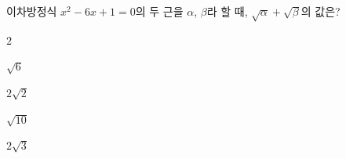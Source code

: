 이차방정식 $x^2-6x+1=0$의 두 근을 $\alpha$, $\beta$라 할 때, $\sqrt{\alpha}+\sqrt{\beta}$의 값은?
\begin{choices32}{\rule[-3ex]{0pt}{8ex}$2$}{\rule[-3ex]{0pt}{8ex}$\sqrt{6}$}{\rule[-3ex]{0pt}{8ex}$2\sqrt{2}$}{\rule[-3ex]{0pt}{8ex}$\sqrt{10}$}{\rule[-3ex]{0pt}{8ex}$2\sqrt{3}$}\end{choices32}
